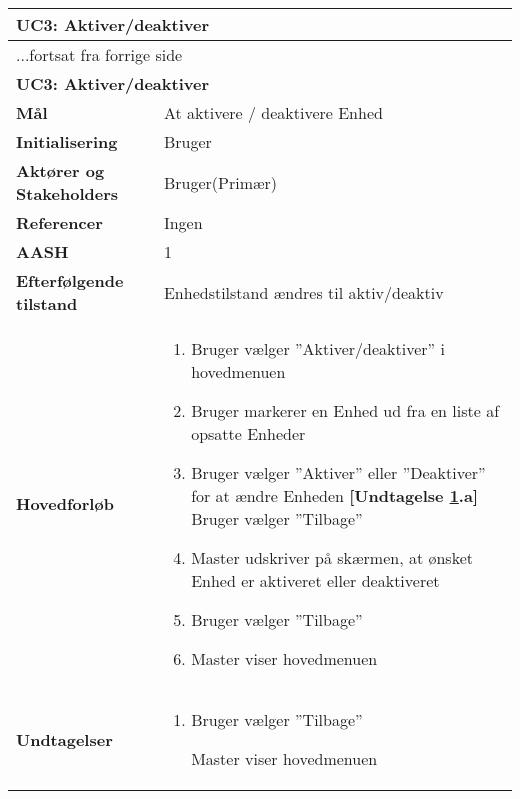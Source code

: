 \begin{center} \centering \label{UC3} 
	\begin{longtable}{|p{5cm}|p{9cm}|}  %
	\hline
		\multicolumn{2}{|l|}{\textbf{UC3: Aktiver/deaktiver}} \\\hline %
		\endfirsthead
		
		\multicolumn{2}{l}{...fortsat fra forrige side} \\ \hline %
		\multicolumn{2}{|l|}{\textbf{UC3: Aktiver/deaktiver}} \\\hline %
		\endhead	
		
		\textbf{Mål}								&At aktivere / deaktivere Enhed	\\\hline
		\textbf{Initialisering}					&Bruger				\\\hline
		\textbf{Aktører og Stakeholders}			&Bruger(Primær)		\\\hline
		\textbf{Referencer}						&Ingen				\\\hline
		\textbf{AASH}							&1					\\\hline
		\textbf{Efterfølgende tilstand}			&Enhedstilstand ændres til aktiv/deaktiv\\\hline
		\textbf{Hovedforløb}					
			&\begin{enumerate}
	
	
				\item Bruger vælger ''Aktiver/deaktiver'' i hovedmenuen
				
				\item Bruger markerer en Enhed ud fra en liste af opsatte Enheder
				
				\item \label{uc3aktiver} Bruger vælger ''Aktiver'' eller ''Deaktiver'' for at ændre Enheden\newline
				\textbf{[Undtagelse \ref{uc3aktiver}.a]} \newline
				Bruger vælger ''Tilbage''
				
				\item Master udskriver på skærmen, at ønsket Enhed er aktiveret eller deaktiveret		
			
				\item Bruger vælger ''Tilbage''
				
				\item Master viser hovedmenuen	
	
			\end{enumerate}\\\hline
			
		\textbf{Undtagelser}
			&\begin{enumerate}[label=\ref{uc3aktiver}.a]
				
				\item Bruger vælger ''Tilbage''
				
					\subitem Master viser hovedmenuen
			\end{enumerate}\\\hline			
			
	\end{longtable}
\end{center}

